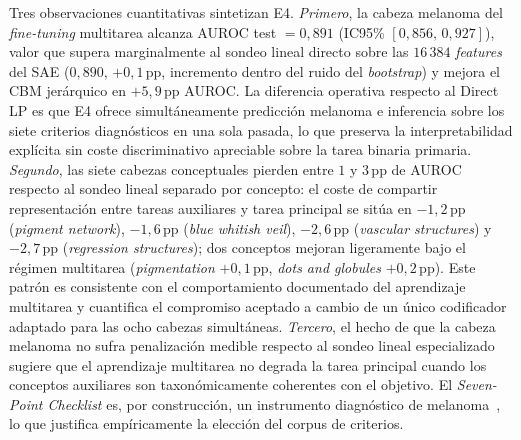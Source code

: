 Tres observaciones cuantitativas sintetizan E4. \textit{Primero},
la cabeza melanoma del \emph{fine-tuning} multitarea alcanza
AUROC test $= 0{,}891$ (IC95\% $[0{,}856,\,0{,}927]$), valor que
supera marginalmente al sondeo lineal directo sobre las
$16\,384$ \emph{features} del SAE ($0{,}890$, $+0{,}1$\,pp,
incremento dentro del ruido del \emph{bootstrap}) y mejora el
CBM jerárquico en $+5{,}9$\,pp AUROC. La diferencia operativa
respecto al Direct LP es que E4 ofrece simultáneamente predicción
melanoma e inferencia sobre los siete criterios diagnósticos en
una sola pasada, lo que preserva la interpretabilidad explícita
sin coste discriminativo apreciable sobre la tarea binaria
primaria. \textit{Segundo}, las siete cabezas conceptuales pierden
entre $1$ y $3$\,pp de AUROC respecto al sondeo lineal separado
por concepto: el coste de compartir representación entre tareas
auxiliares y tarea principal se sitúa en
$-1{,}2$\,pp (\emph{pigment network}), $-1{,}6$\,pp (\emph{blue
whitish veil}), $-2{,}6$\,pp (\emph{vascular structures}) y
$-2{,}7$\,pp (\emph{regression structures}); dos conceptos
mejoran ligeramente bajo el régimen multitarea
(\emph{pigmentation} $+0{,}1$\,pp,
\emph{dots and globules} $+0{,}2$\,pp). Este patrón es
consistente con el comportamiento documentado del aprendizaje
multitarea y cuantifica el compromiso aceptado a cambio de un
único codificador adaptado para las ocho cabezas
simultáneas. \textit{Tercero}, el hecho de que la cabeza melanoma
no sufra penalización medible respecto al sondeo lineal
especializado sugiere que el aprendizaje multitarea no degrada la
tarea principal cuando los conceptos auxiliares son
taxonómicamente coherentes con el objetivo. El
\emph{Seven-Point Checklist} es, por construcción, un instrumento
diagnóstico de melanoma~\cite{kawahara2019}, lo que justifica
empíricamente la elección del corpus de criterios.

